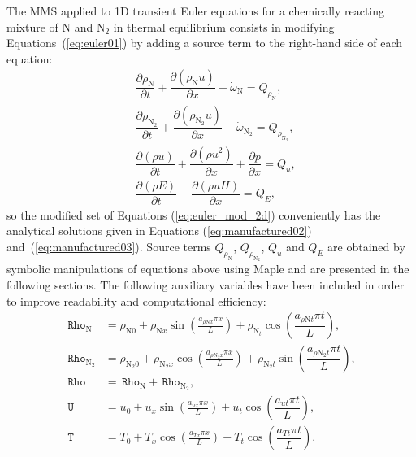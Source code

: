 \documentclass[10pt]{article}
\newcommand{\Diff}[2] {\dfrac{\partial( #1)}{\partial #2}}
\newcommand{\diff}[2] {\dfrac{\partial #1 }{\partial #2}}
\newcommand{\Rho}{\,\mathtt{Rho}}
\newcommand{\T}{\,\mathtt{T}}
\newcommand{\U}{\,\mathtt{U}}
\begin{document}


The MMS applied to 1D transient Euler equations for a chemically reacting mixture of  N and N$_{2}$ in thermal equilibrium consists in modifying  Equations~(\ref{eq:euler01}) by adding a source term to the right-hand side of each equation:
\begin{equation}
 \label{eq:euler_mod_2d}
\begin{split}
&\diff{\rho_{\text{N}}}{t}+\Diff{\rho_{\text{N}} u}{x} -\dot{\omega}_{\text{N}}= Q_{\rho_{\text{N}}},\\
&\diff{\rho_{\text{N}_2}}{t}+\Diff{\rho_{\text{N}_2} u}{x} -\dot{\omega}_{\text{N}_2}= Q_{\rho_{\text{N}_2}},\\
&\Diff{\rho u}{t}+\Diff{\rho u^2 }{x}+ \diff{p}{x} = Q_u,\\
&\Diff{\rho E}{t}+\Diff{\rho u H}{x} = Q_{E},
\end{split}
\end{equation}
%
so the modified set of Equations (\ref{eq:euler_mod_2d}) conveniently has the analytical solutions given in Equations (\ref{eq:manufactured02}) and~(\ref{eq:manufactured03}).
%
Source terms $ Q_{\rho_{\text{N}}}$, $ Q_{\rho_{\text{N}_2}}$, $Q_u$ and $Q_{E}$ are obtained by symbolic manipulations of equations above using Maple and are presented in the following sections. The following auxiliary variables have been included in order to improve readability and computational efficiency:
\begin{equation}
 \begin{split}
\label{eq:aux_1d}
\Rho_{\text{N}} &= \rho_{\text{N}0} + \rho_{\text{N}x} \sin\left(\frac{a_{  \rho \text{N} x }\pi x}{L}\right)+\rho_{\text{N}_t} \cos\left( \dfrac{ a_{ \rho \text{N} t}  \pi t}{L}\right),\\
\Rho_{\text{N}_2} &= \rho_{\text{N}_2 0}+ \rho_{\text{N}_2 x} \cos\left(\frac{a_{ \rho \text{N}_2 x } \pi x}{L}\right)+\rho_{\text{N}_2 t} \sin\left( \dfrac{ a_{ \rho \text{N}_2 t}\pi t}{L}\right),\\
\Rho&=\Rho_{\text{N}}+\Rho_{\text{N}_2},\\
\U &= u_{0}+u_{x} \sin\left(\frac{a_{u x} \pi x}{L}\right)+ u_t \cos\left( \dfrac{ a_{ut}\pi t}{L}\right),\\
\T &= T_{0}+T_{x} \cos\left(\frac{a_{T x} \pi x}{L}\right)+ T_t \cos\left( \dfrac{ a_{Tt} \pi t}{L}\right).\\
\end{split}
\end{equation}
\end{document}

